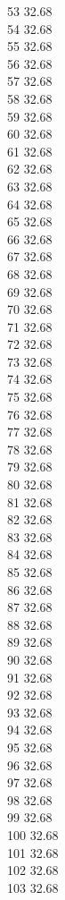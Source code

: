 53	32.68\\
54	32.68\\
55	32.68\\
56	32.68\\
57	32.68\\
58	32.68\\
59	32.68\\
60	32.68\\
61	32.68\\
62	32.68\\
63	32.68\\
64	32.68\\
65	32.68\\
66	32.68\\
67	32.68\\
68	32.68\\
69	32.68\\
70	32.68\\
71	32.68\\
72	32.68\\
73	32.68\\
74	32.68\\
75	32.68\\
76	32.68\\
77	32.68\\
78	32.68\\
79	32.68\\
80	32.68\\
81	32.68\\
82	32.68\\
83	32.68\\
84	32.68\\
85	32.68\\
86	32.68\\
87	32.68\\
88	32.68\\
89	32.68\\
90	32.68\\
91	32.68\\
92	32.68\\
93	32.68\\
94	32.68\\
95	32.68\\
96	32.68\\
97	32.68\\
98	32.68\\
99	32.68\\
100	32.68\\
101	32.68\\
102	32.68\\
103	32.68\\
